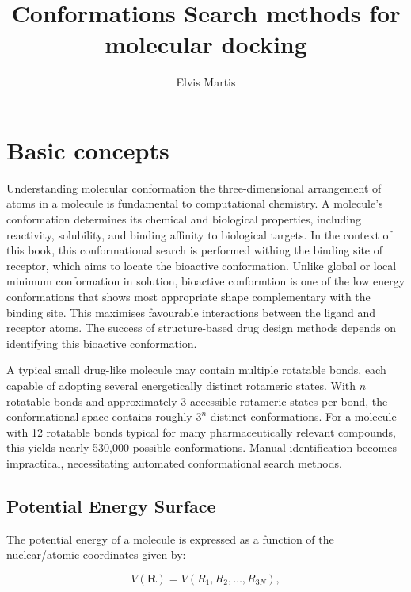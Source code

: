 \documentclass[12pt]{article}
\title{Conformations Search methods for molecular docking}
\author{Elvis Martis}
\begin{document}
\maketitle



\section{Basic concepts}
Understanding molecular conformation the three-dimensional arrangement of atoms in a molecule is fundamental to computational chemistry. A molecule's conformation determines its chemical and biological properties, including reactivity, solubility, and binding affinity to biological targets. In the context of this book, this conformational search is performed withing the binding site of receptor, which aims to locate the bioactive conformation. Unlike global or local minimum conformation in solution, bioactive conformtion is one of the low energy conformations that shows most appropriate shape complementary with the binding site. This maximises favourable interactions between the ligand and receptor atoms. The success of structure-based drug design methods depends on identifying this bioactive conformation. 

A typical small drug-like molecule may contain multiple rotatable bonds, each capable of adopting several energetically distinct rotameric states. With $n$ rotatable bonds and approximately 3 accessible rotameric states per bond, the conformational space contains roughly $3^n$ distinct conformations. For a molecule with 12 rotatable bonds typical for many pharmaceutically relevant compounds, this yields nearly 530,000 possible conformations. Manual identification becomes impractical, necessitating automated conformational search methods.


\subsection{Potential Energy Surface}

The potential energy of a molecule is expressed as a function of the nuclear/atomic coordinates\cite{CH2_Jensen2017,CH2_Cramer2013} given by:

\begin{equation}
  V(\mathbf{R}) = V(R_1, R_2, \dots, R_{3N}),
\end{equation}
\end{document}
